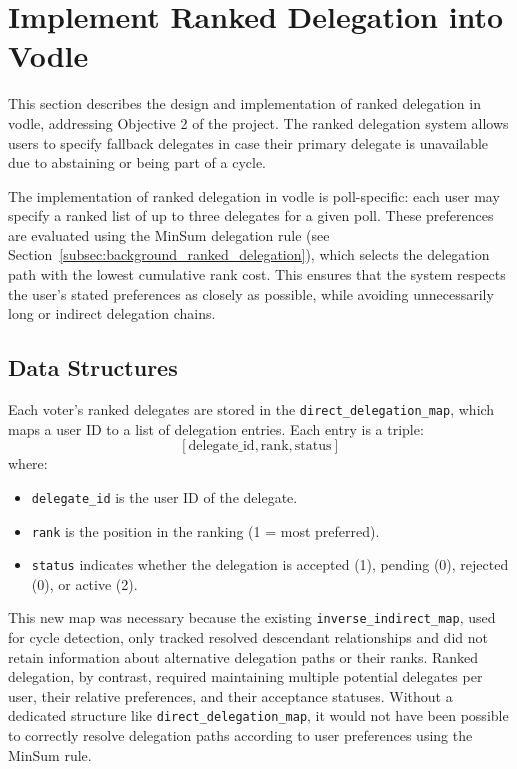 \section{Implement Ranked Delegation into Vodle}\label{sec:design_ranked_delegation}

This section describes the design and implementation of ranked delegation in vodle, addressing Objective 2 of the project. The ranked delegation system allows users to specify fallback delegates in case their primary delegate is unavailable due to abstaining or being part of a cycle.

The implementation of ranked delegation in vodle is poll-specific: each user may specify a ranked list of up to three delegates for a given poll. These preferences are evaluated using the MinSum delegation rule (see Section~\ref{subsec:background_ranked_delegation}), which selects the delegation path with the lowest cumulative rank cost. This ensures that the system respects the user's stated preferences as closely as possible, while avoiding unnecessarily long or indirect delegation chains.

\subsection{Data Structures}
Each voter's ranked delegates are stored in the \texttt{direct\_delegation\_map}, which maps a user ID to a list of delegation entries. Each entry is a triple:
\[
[\text{delegate\_id}, \text{rank}, \text{status}]
\]
where:
\begin{itemize}
    \item \texttt{delegate\_id} is the user ID of the delegate.
    \item \texttt{rank} is the position in the ranking (1 = most preferred).
    \item \texttt{status} indicates whether the delegation is accepted (1), pending (0), rejected (0), or active (2).
\end{itemize}

This new map was necessary because the existing \texttt{inverse\_indirect\_map}, used for cycle detection, only tracked resolved descendant relationships and did not retain information about alternative delegation paths or their ranks. Ranked delegation, by contrast, required maintaining multiple potential delegates per user, their relative preferences, and their acceptance statuses. Without a dedicated structure like \texttt{direct\_delegation\_map}, it would not have been possible to correctly resolve delegation paths according to user preferences using the MinSum rule.

